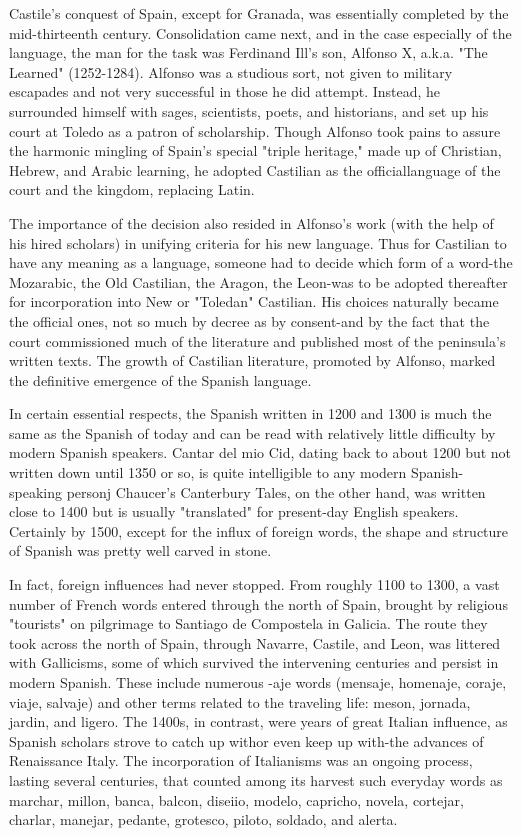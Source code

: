 Castile's conquest of Spain, except for Granada, was essentially completed by the mid-thirteenth century. Consolidation came
next, and in the case especially of the language, the man for the task
was Ferdinand Ill's son, Alfonso X, a.k.a. "The Learned" (1252-1284).
Alfonso was a studious sort, not given to military escapades and not
very successful in those he did attempt. Instead, he surrounded himself
with sages, scientists, poets, and historians, and set up his court at Toledo as a patron of scholarship. Though Alfonso took pains to assure
the harmonic mingling of Spain's special "triple heritage," made up of
Christian, Hebrew, and Arabic learning, he adopted Castilian as the officiallanguage of the court and the kingdom, replacing Latin.

The importance of the decision also resided in Alfonso's work
(with the help of his hired scholars) in unifying criteria for his new language. Thus for Castilian to have any meaning as a language, someone
had to decide which form of a word-the Mozarabic, the Old Castilian,
the Aragon, the Leon-was to be adopted thereafter for incorporation
into New or "Toledan" Castilian. His choices naturally became the official ones, not so much by decree as by consent-and by the fact that
the court commissioned much of the literature and published most of
the peninsula's written texts. The growth of Castilian literature, promoted by Alfonso, marked the definitive emergence of the Spanish
language.

In certain essential respects, the Spanish written in 1200 and
1300 is much the same as the Spanish of today and can be read with
relatively little difficulty by modern Spanish speakers. Cantar del mio
Cid, dating back to about 1200 but not written down until 1350 or so,
is quite intelligible to any modern Spanish-speaking personj Chaucer's
Canterbury Tales, on the other hand, was written close to 1400 but
is usually "translated" for present-day English speakers. Certainly by
1500, except for the influx of foreign words, the shape and structure of
Spanish was pretty well carved in stone.

In fact, foreign influences had never stopped. From roughly
1100 to 1300, a vast number of French words entered through the
north of Spain, brought by religious "tourists" on pilgrimage to Santiago de Compostela in Galicia. The route they took across the north
of Spain, through Navarre, Castile, and Leon, was littered with Gallicisms, some of which survived the intervening centuries and persist in
modern Spanish. These include numerous -aje words (mensaje, homenaje, coraje, viaje, salvaje) and other terms related to the traveling life:
meson, jornada, jardin, and ligero. The 1400s, in contrast, were years
of great Italian influence, as Spanish scholars strove to catch up withor even keep up with-the advances of Renaissance Italy. The incorporation of Italianisms was an ongoing process, lasting several centuries,
that counted among its harvest such everyday words as marchar, millon, banca, balcon, diseiio, modelo, capricho, novela, cortejar, charlar,
manejar, pedante, grotesco, piloto, soldado, and alerta.

